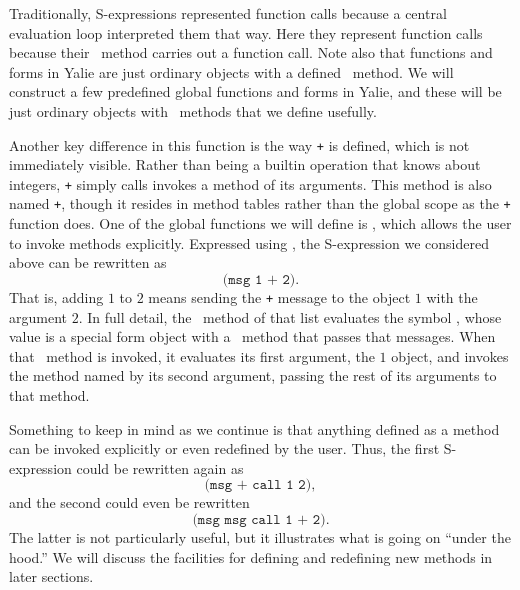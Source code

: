 \documentclass[twocolumn]{article}
\begin{document}
Traditionally, S-expressions represented function calls because a
central evaluation loop interpreted them that way. Here they represent
function calls because their \eval\ method carries out a
function call. Note also that functions and forms in Yalie are just
ordinary objects with a defined \call\ method. We will
construct a few predefined global functions and forms in Yalie, and
these will be just ordinary objects with \call\ methods that we
define usefully.

Another key difference in this function is the way \texttt{+} is
defined, which is not immediately visible. Rather than being a builtin
operation that knows about integers, \texttt{+} simply calls invokes a
method of its arguments. This method is also named \texttt{+}, though
it resides in method tables rather than the global scope as the
\texttt{+} function does. One of the global functions we will define
is \msg, which allows the user to invoke methods explicitly. Expressed
using \msg, the S-expression we considered above can be rewritten as
\[\texttt{(msg 1 + 2)}.\]
That is, adding $1$ to $2$ means sending the \texttt{+} message to the
object $1$ with the argument $2$. In full detail, the \eval\ method of
that list evaluates the symbol \msg, whose value is a special form
object with a \call\ method that passes that messages. When that \call\
method is invoked, it evaluates its first argument, the $1$ object,
and invokes the method named by its second argument, passing the rest
of its arguments to that method.

Something to keep in mind as we continue is that anything defined as a
method can be invoked explicitly or even redefined by the user. Thus,
the first S-expression could be rewritten again as
\[ \texttt{(msg + call 1 2)}, \]
and the second could even be rewritten
\[ \texttt{(msg msg call 1 + 2)}. \] The latter is not particularly
useful, but it illustrates what is going on ``under the hood.'' We
will discuss the facilities for defining and redefining new methods in
later sections.
\end{document}
